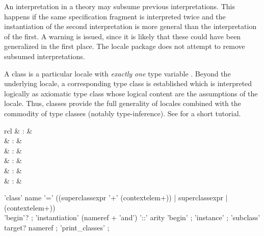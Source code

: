 \begin{isabellebody}
\begin{isamarkuptext}
  \begin{warn}
    An interpretation in a theory may subsume previous
    interpretations.  This happens if the same specification fragment
    is interpreted twice and the instantiation of the second
    interpretation is more general than the interpretation of the
    first.  A warning is issued, since it is likely that these could
    have been generalized in the first place.  The locale package does
    not attempt to remove subsumed interpretations.
  \end{warn}%
\end{isamarkuptext}%
\isamarkuptrue%
%
\isamarkuptrue%
%
\begin{isamarkuptext}%
A class is a particular locale with \emph{exactly one} type variable
  \isa{{\isasymalpha}}.  Beyond the underlying locale, a corresponding type class
  is established which is interpreted logically as axiomatic type
  class \cite{Wenzel:1997:TPHOL} whose logical content are the
  assumptions of the locale.  Thus, classes provide the full
  generality of locales combined with the commodity of type classes
  (notably type-inference).  See \cite{isabelle-classes} for a short
  tutorial.

  \begin{matharray}{rcl}
    \mbox{} & : &  \\
    \mbox{} & : &  \\
    \mbox{} & : &  \\
    \mbox{} & : &  \\
    \mbox{}\isa{\isactrlsup {\isacharasterisk}} & : &  \\
    \mbox{} & : & \isarmeth \\
  \end{matharray}

  \begin{rail}
    'class' name '=' ((superclassexpr '+' (contextelem+)) | superclassexpr | (contextelem+)) \\
      'begin'?
    ;
    'instantiation' (nameref + 'and') '::' arity 'begin'
    ;
    'instance'
    ;
    'subclass' target? nameref
    ;
    'print\_classes'
    ;


\end{rail}
\end{isamarkuptext}
\end{isabellebody}
